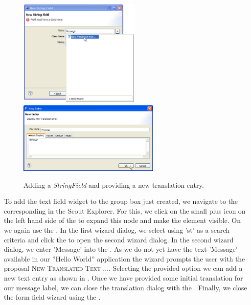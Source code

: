 \documentclass[a4paper,10pt,twoside]{book}
\begin{document}
\begin{figure}
\includegraphics[width=6cm]{sdk_new_field_stringfield_1.png} \hspace{8mm}
\includegraphics[width=7cm]{sdk_new_field_stringfield_2.png}
\caption{Adding a \textit{StringField} and providing a new translation entry.}
\end{figure}

To add the text field widget to the group box just created, we navigate to the corresponding  in the Scout Explorer.
For this, we click on the small plus icon on the left hand side of the  to expand this node and make the  element visible.
On  we again use the .
In the first wizard dialog, we select  using 'st' as a search criteria and click the  to open the second wizard dialog.
In the second wizard dialog, we enter 'Message' into the .
As we do not yet have the text 'Message' available in our ''Hello World'' application the wizard prompts the user with the proposal \textsc{New Translated Text ...}.
Selecting the provided option we can add a new text entry as shown in .
Once we have provided some initial translation for our message label, we can close the translation dialog with the .
Finally, we close the form field wizard using the .
\end{document}
